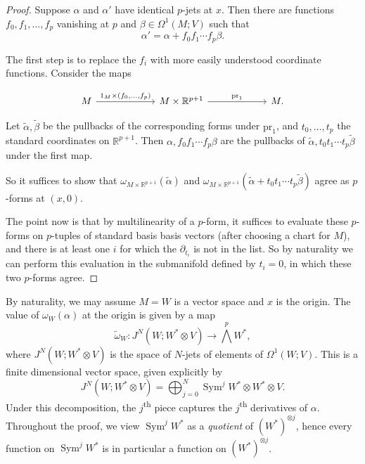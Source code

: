 \documentclass{shortart}
\theoremstyle{definition}
\DeclareMathOperator\Sym{Sym}
\newcommand\R{\mathbb{R}}
\newcommand\pr{\mathrm{pr}}
\newcommand\exterior{{\textstyle \bigwedge}}
\begin{document}
\begin{proof}
  Suppose $\alpha$ and $\alpha'$ have identical $p$-jets at $x$. Then there are functions $f_0, f_1, \ldots, f_p$ vanishing at $p$ and $\beta \in \Omega^1(M; V)$ such that
  \[
    \alpha' = \alpha + f_0 f_1 \cdots f_p \beta.
  \]

  The first step is to replace the $f_i$ with more easily understood coordinate functions. Consider the maps
  \begin{useimager}
    \[
      \begin{tikzcd}[column sep=6em]
        M \ar[r, "{1_M \times (f_0, \ldots, f_p)}"] & M \times \R^{p + 1} \ar[r, "\mathrm{pr}_1"] & M.
      \end{tikzcd}
    \]
  \end{useimager}%
  Let $\tilde{\alpha}, \tilde{\beta}$ be the pullbacks of the corresponding forms under $\pr_1$, and $t_0, \ldots, t_p$ the standard coordinates on $\R^{p + 1}$. Then $\alpha, f_0 f_1\cdots f_p \beta$ are the pullbacks of $\tilde{\alpha}, t_0 t_1\cdots t_p \tilde{\beta}$ under the first map.

  So it suffices to show that $\omega_{M \times \R^{p + 1}}(\tilde{\alpha})$ and $\omega_{M \times \R^{p + 1}}(\tilde{\alpha} + t_0 t_1 \cdots t_p \tilde{\beta})$ agree as $p$-forms at $(x, 0)$.

  The point now is that by multilinearity of a $p$-form, it suffices to evaluate these $p$-forms on $p$-tuples of standard basis basis vectors (after choosing a chart for $M$), and there is at least one $i$ for which the $\partial_{t_i}$ is not in the list. So by naturality we can perform this evaluation in the submanifold defined by $t_i = 0$, in which these two $p$-forms agree. 
\end{proof}

By naturality, we may assume $M = W$ is a vector space and $x$ is the origin. The value of $\omega_W(\alpha)$ at the origin is given by a map
\[
  \tilde{\omega}_W: J^N(W; W^* \otimes V) \to \exterior^p W^*,
\]
where $J^N(W; W^* \otimes V)$ is the space of $N$-jets of elements of $\Omega^1(W; V)$. This is a finite dimensional vector space, given explicitly by
\[
  J^N(W; W^* \otimes V) = \bigoplus_{j = 0}^N \Sym^j W^* \otimes W^* \otimes V.
\]
Under this decomposition, the $j$\textsuperscript{th} piece captures the $j$\textsuperscript{th} derivatives of $\alpha$. Throughout the proof, we view $\Sym^j W^*$ as a \emph{quotient} of $(W^*)^{\otimes j}$, hence every function on $\Sym^j W^*$ is in particular a function on $(W^*)^{\otimes j}$.
\end{document}

